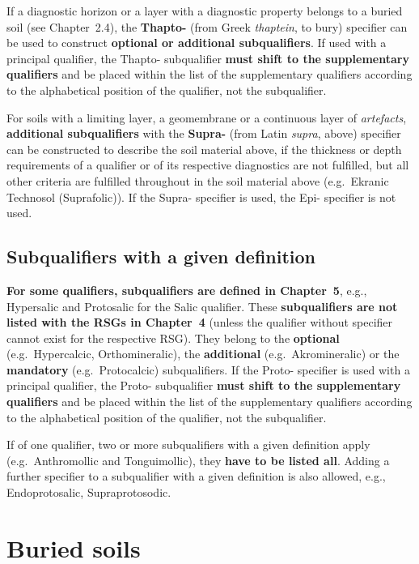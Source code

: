 \documentclass[
  letterpaper,
  DIV=11,
  numbers=noendperiod]{scrreprt}
\begin{document}
If a diagnostic horizon or a layer with a diagnostic property belongs to
a buried soil (see Chapter~2.4), the \textbf{Thapto-} (from Greek
\emph{thaptein}, to bury) specifier can be used to construct
\textbf{optional or additional subqualifiers}. If used with a principal
qualifier, the Thapto- subqualifier \textbf{must shift to the
supplementary qualifiers} and be placed within the list of the
supplementary qualifiers according to the alphabetical position of the
qualifier, not the subqualifier.

For soils with a limiting layer, a geomembrane or a continuous layer of
\emph{artefacts}, \textbf{additional subqualifiers} with the
\textbf{Supra-} (from Latin \emph{supra}, above) specifier can be
constructed to describe the soil material above, if the thickness or
depth requirements of a qualifier or of its respective diagnostics are
not fulfilled, but all other criteria are fulfilled throughout in the
soil material above (e.g.~Ekranic Technosol (Suprafolic)). If the Supra-
specifier is used, the Epi- specifier is not used.

\hypertarget{subqualifiers-with-a-given-definition}{%
\subsection{Subqualifiers with a given
definition}\label{subqualifiers-with-a-given-definition}}

\textbf{For some qualifiers, subqualifiers are defined in Chapter~5},
e.g., Hypersalic and Protosalic for the Salic qualifier. These
\textbf{subqualifiers are not listed with the RSGs in Chapter~4} (unless
the qualifier without specifier cannot exist for the respective RSG).
They belong to the \textbf{optional} (e.g.~Hypercalcic, Orthomineralic),
the \textbf{additional} (e.g.~Akromineralic) or the \textbf{mandatory}
(e.g.~Protocalcic) subqualifiers. If the Proto- specifier is used with a
principal qualifier, the Proto- subqualifier \textbf{must shift to the
supplementary qualifiers} and be placed within the list of the
supplementary qualifiers according to the alphabetical position of the
qualifier, not the subqualifier.

If of one qualifier, two or more subqualifiers with a given definition
apply (e.g.~Anthromollic and Tonguimollic), they \textbf{have to be
listed all}. Adding a further specifier to a subqualifier with a given
definition is also allowed, e.g., Endoprotosalic, Supraprotosodic.

\hypertarget{buried-soils}{%
\section{Buried soils}\label{buried-soils}}
\end{document}
